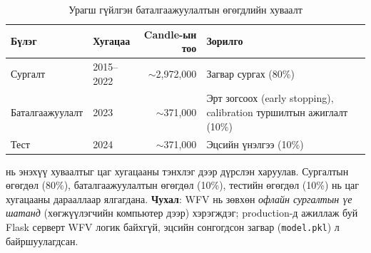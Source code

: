 \begin{table}[H]
\centering
\caption{Урагш гүйлгэн баталгаажуулалтын өгөгдлийн хуваалт}
\label{tab:data_split}
\setlength{\tabcolsep}{4pt}
\begin{tabularx}{\textwidth}{|l|l|r|>{\raggedright\arraybackslash}X|}
\hline
\textbf{Бүлэг} & \textbf{Хугацаа} & \textbf{Candle-ын тоо} & \textbf{Зорилго} \\ \hline
Сургалт & 2015--2022 & $\sim$2,972,000 & Загвар сургах (80\%) \\ \hline
Баталгаажуулалт & 2023 & $\sim$371,000 & Эрт зогсоох (early stopping), calibration туршилтын ажиглалт (10\%) \\ \hline
Тест & 2024 & $\sim$371,000 & Эцсийн үнэлгээ (10\%) \\ \hline
\end{tabularx}
\end{table}

 нь энэхүү хуваалтыг цаг хугацааны тэнхлэг дээр дүрслэн харуулав. Сургалтын өгөгдөл (80\%), баталгаажуулалтын өгөгдөл (10\%), тестийн өгөгдөл (10\%) нь цаг хугацааны дарааллаар ялгагдана. \textbf{Чухал}: WFV нь зөвхөн \emph{офлайн сургалтын үе шатанд} (хөгжүүлэгчийн компьютер дээр) хэрэгждэг; production-д ажиллаж буй Flask серверт WFV логик байхгүй, эцсийн сонгогдсон загвар (\texttt{model.pkl}) л байршуулагдсан.

